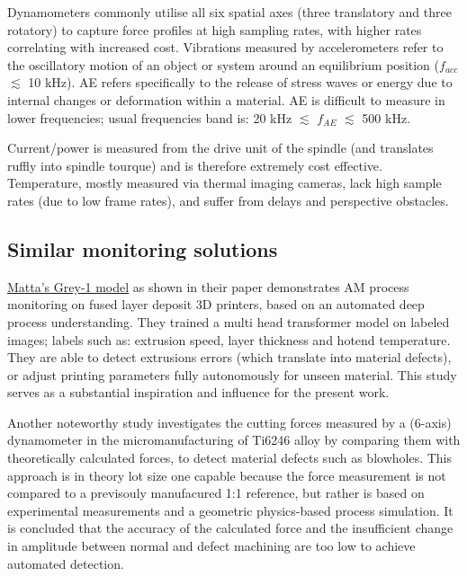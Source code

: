 \documentclass[5p,times,procedia]{elsarticle}
\begin{document}
\vspace*{-.5\baselineskip}
Dynamometers commonly utilise all six spatial axes (three translatory and three rotatory) to capture force profiles at high sampling rates, with higher rates correlating with increased cost.
Vibrations measured by accelerometers refer to the oscillatory motion of an object or system around an equilibrium position ($f_{acc}$ $\lesssim$ 10 kHz).
AE refers specifically to the release of stress waves or energy due to internal changes or deformation within a material. AE is difficult to measure in lower frequencies; usual frequencies band is: 20 kHz $\lesssim$ $f_{AE}$ $\lesssim$ 500 kHz. \cite{Jozwik.Mika2015, Sun.Hu.ea2020}

Current/power is measured from the drive unit of the spindle (and translates ruffly into spindle tourque) and is therefore extremely cost effective.
Temperature, mostly measured via thermal imaging cameras, lack high sample rates (due to low frame rates), and suffer from delays and perspective obstacles. 



\subsection{Similar monitoring solutions}
\vspace*{-\baselineskip}


\href{https://www.matta.ai/greymatta}{Matta's Grey-1 model} as shown in their paper \cite{Brion.Pattinson2022} demonstrates AM process monitoring on fused layer deposit 3D printers, based on an automated deep process understanding. 
They trained a multi head transformer model on labeled images; labels such as: extrusion speed, layer thickness and hotend temperature. They are able to detect extrusions errors (which translate into material defects), or adjust printing parameters fully autonomously for unseen material. \cite{Brion.Pattinson2022}
This study serves as a substantial inspiration and influence for the present work.


Another noteworthy study \cite{Pfirrmann.Baumann.ea2021} investigates the cutting forces measured by a (6-axis) dynamometer in the micromanufacturing of Ti6246 alloy by comparing them with theoretically calculated forces, to detect material defects such as blowholes.
This approach is in theory lot size one capable because the force measurement is not compared to a previsouly manufacured 1:1 reference, but rather is based on experimental measurements and a geometric physics-based process simulation. 
It is concluded that the accuracy of the calculated force and the insufficient change in amplitude between normal and defect machining are too low to achieve automated detection. \cite[p.169]{Pfirrmann.Baumann.ea2021} 
\end{document}
